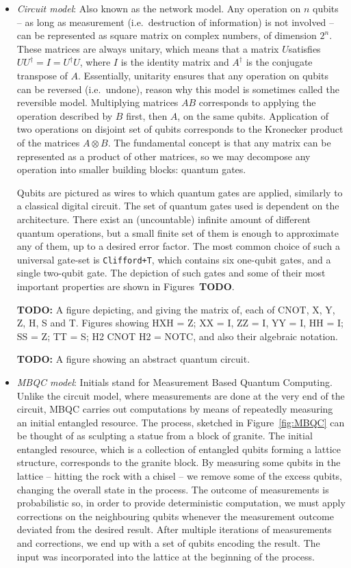 \begin{itemize}

  \item \textit{Circuit model}: Also known as the network model. Any operation on \(n\) qubits -- as long as measurement (i.e.\ destruction of information) is not involved -- can be represented as square matrix on complex numbers, of dimension \(2^n\). These matrices are always unitary, which means that a matrix \(U\)satisfies \(UU^\dag = I = U^\dag U\), where \(I\) is the identity matrix and \(A^\dag\) is the conjugate transpose of \(A\). Essentially, unitarity ensures that any operation on qubits can be reversed (i.e.\ undone), reason why this model is sometimes called the reversible model. Multiplying matrices \(AB\) corresponds to applying the operation described by \(B\) first, then \(A\), on the same qubits. Application of two operations on disjoint set of qubits corresponds to the Kronecker product of the matrices \(A \otimes B\). The fundamental concept is that any matrix can be represented as a product of other matrices, so we may decompose any operation into smaller building blocks: quantum gates.

  Qubits are pictured as wires to which quantum gates are applied, similarly to a classical digital circuit. The set of quantum gates used is dependent on the architecture. There exist an (uncountable) infinite amount of different quantum operations, but a small finite set of them is enough to approximate any of them, up to a desired error factor. The most common choice of such a universal gate-set is \texttt{Clifford+T}, which contains six one-qubit gates, and a single two-qubit gate. The depiction of such gates and some of their most important properties are shown in Figures~\textbf{TODO}.

  \textbf{TODO:} A figure depicting, and giving the matrix of, each of CNOT, X, Y, Z, H, S and T. Figures showing HXH = Z; XX = I, ZZ = I, YY = I, HH = I; SS = Z; TT = S; H2 CNOT H2 = NOTC, and also their algebraic notation.

  \textbf{TODO:} A figure showing an abstract quantum circuit.

  \item \textit{MBQC model}: Initials stand for Measurement Based Quantum Computing. Unlike the circuit model, where measurements are done at the very end of the circuit, MBQC carries out computations by means of repeatedly measuring an initial entangled resource. The process, sketched in Figure~\ref{fig:MBQC} can be thought of as sculpting a statue from a block of granite. The initial entangled resource, which is a collection of entangled qubits forming a lattice structure, corresponds to the granite block. By measuring some qubits in the lattice -- hitting the rock with a chisel -- we remove some of the excess qubits, changing the overall state in the process. The outcome of measurements is probabilistic so, in order to provide deterministic computation, we must apply corrections on the neighbouring qubits whenever the measurement outcome deviated from the desired result. After multiple iterations of measurements and corrections, we end up with a set of qubits encoding the result. The input was incorporated into the lattice at the beginning of the process.


\end{itemize}
